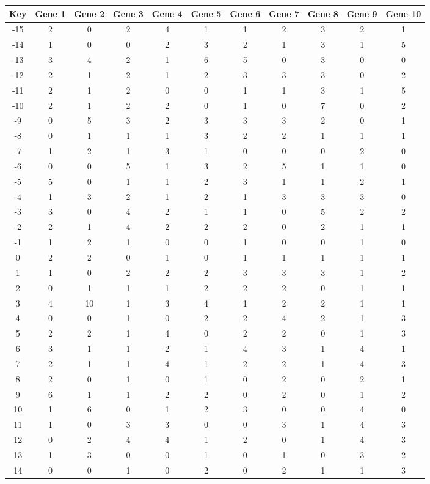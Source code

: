 \begin{tabular}{|c|c|c|c|c|c|c|c|c|c|c|}
\hline
Key & Gene 1 & Gene 2 & Gene 3 & Gene 4 & Gene 5 & Gene 6 & Gene 7 & Gene 8 & Gene 9 & Gene 10 \\
\hline
-15 & 2 & 0 & 2 & 4 & 1 & 1 & 2 & 3 & 2 & 1 \\
-14 & 1 & 0 & 0 & 2 & 3 & 2 & 1 & 3 & 1 & 5 \\
-13 & 3 & 4 & 2 & 1 & 6 & 5 & 0 & 3 & 0 & 0 \\
-12 & 2 & 1 & 2 & 1 & 2 & 3 & 3 & 3 & 0 & 2 \\
-11 & 2 & 1 & 2 & 0 & 0 & 1 & 1 & 3 & 1 & 5 \\
-10 & 2 & 1 & 2 & 2 & 0 & 1 & 0 & 7 & 0 & 2 \\
-9 & 0 & 5 & 3 & 2 & 3 & 3 & 3 & 2 & 0 & 1 \\
-8 & 0 & 1 & 1 & 1 & 3 & 2 & 2 & 1 & 1 & 1 \\
-7 & 1 & 2 & 1 & 3 & 1 & 0 & 0 & 0 & 2 & 0 \\
-6 & 0 & 0 & 5 & 1 & 3 & 2 & 5 & 1 & 1 & 0 \\
-5 & 5 & 0 & 1 & 1 & 2 & 3 & 1 & 1 & 2 & 1 \\
-4 & 1 & 3 & 2 & 1 & 2 & 1 & 3 & 3 & 3 & 0 \\
-3 & 3 & 0 & 4 & 2 & 1 & 1 & 0 & 5 & 2 & 2 \\
-2 & 2 & 1 & 4 & 2 & 2 & 2 & 0 & 2 & 1 & 1 \\
-1 & 1 & 2 & 1 & 0 & 0 & 1 & 0 & 0 & 1 & 0 \\
0 & 2 & 2 & 0 & 1 & 0 & 1 & 1 & 1 & 1 & 1 \\
1 & 1 & 0 & 2 & 2 & 2 & 3 & 3 & 3 & 1 & 2 \\
2 & 0 & 1 & 1 & 1 & 2 & 2 & 2 & 0 & 1 & 1 \\
3 & 4 & 10 & 1 & 3 & 4 & 1 & 2 & 2 & 1 & 1 \\
4 & 0 & 0 & 1 & 0 & 2 & 2 & 4 & 2 & 1 & 3 \\
5 & 2 & 2 & 1 & 4 & 0 & 2 & 2 & 0 & 1 & 3 \\
6 & 3 & 1 & 1 & 2 & 1 & 4 & 3 & 1 & 4 & 1 \\
7 & 2 & 1 & 1 & 4 & 1 & 2 & 2 & 1 & 4 & 3 \\
8 & 2 & 0 & 1 & 0 & 1 & 0 & 2 & 0 & 2 & 1 \\
9 & 6 & 1 & 1 & 2 & 2 & 0 & 2 & 0 & 1 & 2 \\
10 & 1 & 6 & 0 & 1 & 2 & 3 & 0 & 0 & 4 & 0 \\
11 & 1 & 0 & 3 & 3 & 0 & 0 & 3 & 1 & 4 & 3 \\
12 & 0 & 2 & 4 & 4 & 1 & 2 & 0 & 1 & 4 & 3 \\
13 & 1 & 3 & 0 & 0 & 1 & 0 & 1 & 0 & 3 & 2 \\
14 & 0 & 0 & 1 & 0 & 2 & 0 & 2 & 1 & 1 & 3 \\
\hline
\end{tabular}